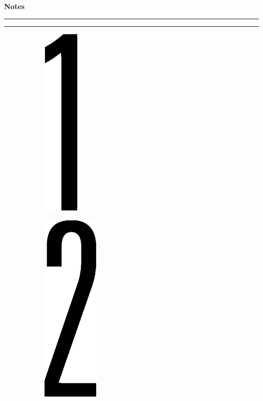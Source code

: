 \newpage
\begin{notesbox}
\textbf{Notes} \\
\rule{\linewidth}{0.02cm}
\end{notesbox}


\newpage
\rule{\linewidth}{0.1cm} \par
\begin{figure}[H]
  \begin{subfigure}[l]{0.15\textwidth}
    \includegraphics[height=0.35\textheight]{Sources/PortalNumbers/1.jpg}
  \end{subfigure}
  \begin{subfigure}[l]{0.5\textwidth}
    \includegraphics[height=0.35\textheight]{Sources/PortalNumbers/2.jpg}
  \end{subfigure}
  
\end{figure}

